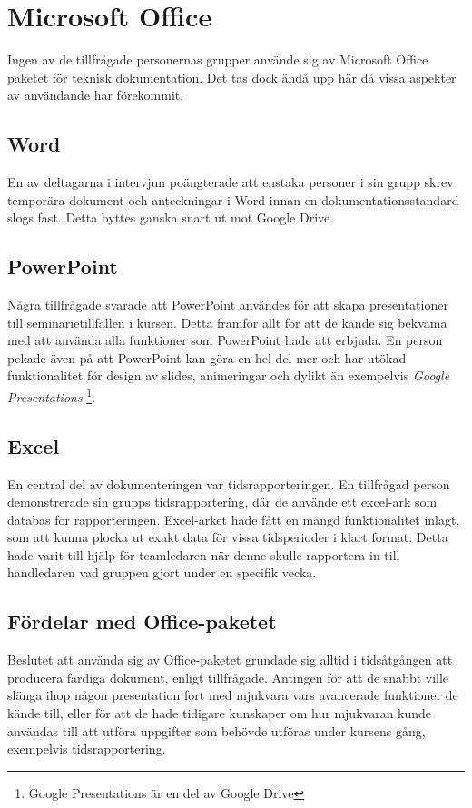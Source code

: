 \section{Microsoft Office}
\label{sec:wassing-microsoft-office}
Ingen av de tillfrågade personernas grupper använde sig av Microsoft Office paketet för teknisk dokumentation. Det tas dock ändå upp här då vissa aspekter av användande har förekommit.

\subsection{Word}
En av deltagarna i intervjun poängterade att enstaka personer i sin grupp skrev temporära dokument och anteckningar i Word innan en dokumentationsstandard slogs fast. Detta byttes ganska snart ut mot Google Drive.

\subsection{PowerPoint}
Några tillfrågade svarade att PowerPoint användes för att skapa presentationer till seminarietillfällen i kursen. Detta framför allt för att de kände sig bekväma med att använda alla funktioner som PowerPoint hade att erbjuda. En person pekade även på att PowerPoint kan göra en hel del mer och har utökad funktionalitet för design av slides, animeringar och dylikt än exempelvis \textit{Google Presentations} \footnote{Google Presentations är en del av Google Drive}.

\subsection{Excel}
En central del av dokumenteringen var tidsrapporteringen. En tillfrågad person demonstrerade sin grupps tidsrapportering, där de använde ett excel-ark som databas för rapporteringen. Excel-arket hade fått en mängd funktionalitet inlagt, som att kunna plocka ut exakt data för vissa tidsperioder i klart format. Detta hade varit till hjälp för teamledaren när denne skulle rapportera in till handledaren vad gruppen gjort under en specifik vecka.

\subsection{Fördelar med Office-paketet}
Beslutet att använda sig av Office-paketet grundade sig alltid i tidsåtgången att producera färdiga dokument, enligt tillfrågade. Antingen för att de snabbt ville slänga ihop någon presentation fort med mjukvara vars avancerade funktioner de kände till, eller för att de hade tidigare kunskaper om hur mjukvaran kunde användas till att utföra uppgifter som behövde utföras under kursens gång, exempelvis tidsrapportering.

